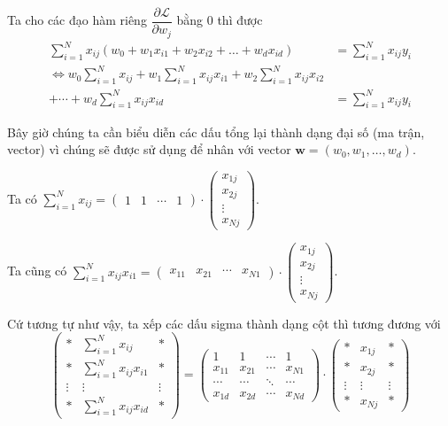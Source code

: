 Ta cho các đạo hàm riêng $\dfrac{\partial \mathcal{L}}{\partial w_j}$ bằng 0 thì được
\begin{align*}
    \sum_{i=1}^N x_{ij} (w_0 + w_1 x_{i1} + w_2 x_{i2} + \ldots + w_d x_{id}) & = \sum_{i=1}^N x_{ij} y_i \\ \Leftrightarrow w_0 \sum_{i=1}^N x_{ij} + w_1 \sum_{i=1}^N x_{ij} x_{i1} + w_2 \sum_{i=1}^N x_{ij} x_{i2} \\ + \cdots + w_d \sum_{i=1}^N x_{ij} x_{id} & = \sum_{i=1}^N x_{ij} y_i
\end{align*}

Bây giờ chúng ta cần biểu diễn các dấu tổng lại thành dạng đại số (ma trận, vector) vì chúng sẽ được sử dụng để nhân với vector $\bm{w} = (w_0, w_1, \ldots, w_d)$.

Ta có $\sum_{i=1}^N x_{ij} = \begin{pmatrix}
    1 & 1 & \cdots & 1
\end{pmatrix} \cdot \begin{pmatrix}
    x_{1j} \\ x_{2j} \\ \vdots \\ x_{Nj}
\end{pmatrix}$.

Ta cũng có $\sum_{i=1}^N x_{ij} x_{i1} = \begin{pmatrix}
    x_{11} & x_{21} & \cdots & x_{N1}
\end{pmatrix} \cdot \begin{pmatrix}
    x_{1j} \\ x_{2j} \\ \vdots \\ x_{Nj}
\end{pmatrix}$.

Cứ tương tự như vậy, ta xếp các dấu sigma thành dạng cột thì tương đương với \[\begin{pmatrix}
    * & \sum_{i=1}^N x_{ij} & * \\ * & \sum_{i=1}^N x_{ij} x_{i1} & * \\ \vdots & \vdots & \vdots \\ * & \sum_{i=1}^N x_{ij} x_{id} & *
\end{pmatrix} = \begin{pmatrix}
    1 & 1 & \cdots & 1 \\ x_{11} & x_{21} & \cdots & x_{N1} \\ \cdots & \cdots & \ddots & \cdots \\ x_{1d} & x_{2d} & \cdots & x_{Nd} 
\end{pmatrix} \cdot \begin{pmatrix}
    * & x_{1j} & * \\ * & x_{2j} & * \\ \vdots & \vdots & \vdots \\ * & x_{Nj} & *
\end{pmatrix}\]

